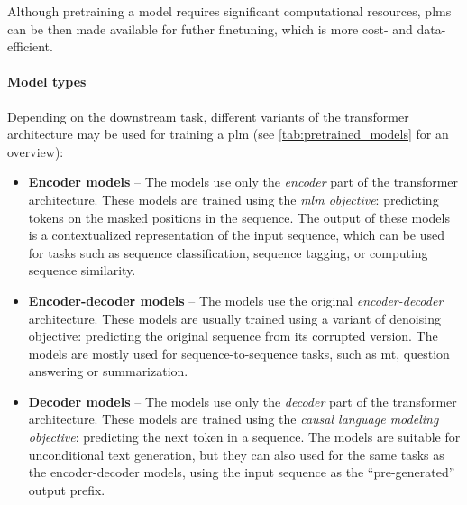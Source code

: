 Although pretraining a model requires significant computational resources, \acp{plm} can be then made available for futher finetuning, which is more cost- and data- efficient.


\paragraph{Model types} Depending on the downstream task, different variants of the transformer architecture may be used for training a \ac{plm} (see \autoref{tab:pretrained_models} for an overview):

\begin{itemize}
    \item \textbf{Encoder models} -- The models use only the \emph{encoder} part of the transformer architecture. These models are trained using the \emph{\ac{mlm} objective}: predicting tokens on the masked positions in the sequence. The output of these models is a contextualized representation of the input sequence, which can be used for tasks such as sequence classification, sequence tagging, or computing sequence similarity.
    \item \textbf{Encoder-decoder models} -- The models use the original \emph{encoder-decoder} architecture. These models are usually trained using a variant of denoising objective: predicting the original sequence from its corrupted version. The models are mostly used for sequence-to-sequence tasks, such as \ac{mt}, question answering or summarization.
    \item \textbf{Decoder models} -- The models use only the \emph{decoder} part of the transformer architecture. These models are trained using the \emph{causal language modeling objective}: predicting the next token in a sequence. The models are suitable for unconditional text generation, but they can also used for the same tasks as the encoder-decoder models, using the input sequence as the ``pre-generated'' output prefix.
\end{itemize}

